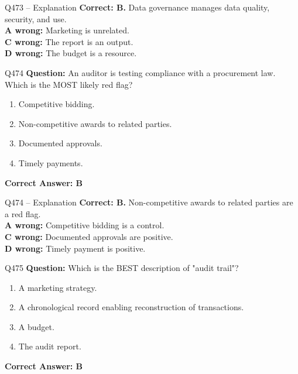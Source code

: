 \documentclass[aspectratio=169,10pt]{beamer}
\begin{document}
	\begin{frame}[t]{Q473 -- Explanation}
		\small
		\textbf{Correct: B.} Data governance manages data quality, security, and use. \\[4pt]
		\textbf{A wrong:} Marketing is unrelated. \\[2pt]
		\textbf{C wrong:} The report is an output. \\[2pt]
		\textbf{D wrong:} The budget is a resource.
	\end{frame}
	
	\begin{frame}[t]{Q474}
		\small
		\textbf{Question:} An auditor is testing compliance with a procurement law. Which is the MOST likely red flag?
		\begin{enumerate}[label=\Alph*.,itemsep=1pt,topsep=2pt]
			\item Competitive bidding.
			\item Non-competitive awards to related parties.
			\item Documented approvals.
			\item Timely payments.
		\end{enumerate}
		\vspace{4pt}
		\textbf{Correct Answer: B}
	\end{frame}
	
	\begin{frame}[t]{Q474 -- Explanation}
		\small
		\textbf{Correct: B.} Non-competitive awards to related parties are a red flag. \\[4pt]
		\textbf{A wrong:} Competitive bidding is a control. \\[2pt]
		\textbf{C wrong:} Documented approvals are positive. \\[2pt]
		\textbf{D wrong:} Timely payment is positive.
	\end{frame}
	
	\begin{frame}[t]{Q475}
		\small
		\textbf{Question:} Which is the BEST description of "audit trail"?
		\begin{enumerate}[label=\Alph*.,itemsep=1pt,topsep=2pt]
			\item A marketing strategy.
			\item A chronological record enabling reconstruction of transactions.
			\item A budget.
			\item The audit report.
		\end{enumerate}
		\vspace{4pt}
		\textbf{Correct Answer: B}
	\end{frame}
	
\end{document}
